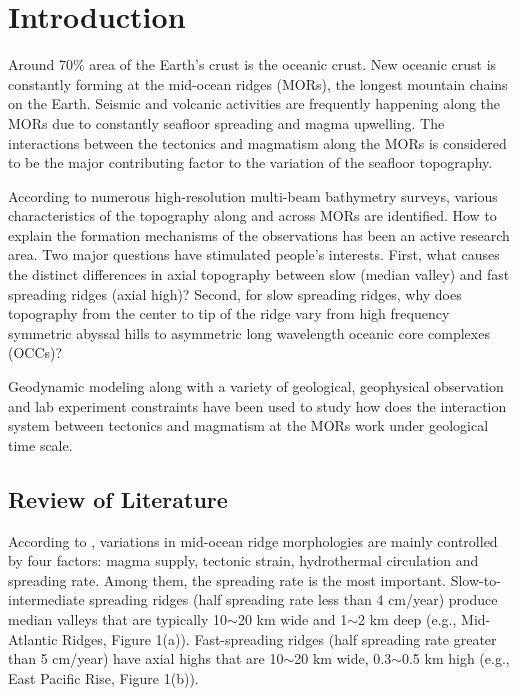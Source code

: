 \pagebreak
\section{Introduction}
\label{ch:Intro}  %

Around 70\% area of the Earth's crust is the oceanic crust. New oceanic crust is constantly forming at the mid-ocean ridges (MORs), the longest mountain chains on the Earth. Seismic and volcanic activities are frequently happening along the MORs due to constantly seafloor spreading and magma upwelling. The interactions between the tectonics and magmatism along the MORs is considered to be the major contributing factor to the variation of the seafloor topography.    

According to numerous high-resolution multi-beam bathymetry surveys, various characteristics of the topography along and across MORs are identified. How to explain the formation mechanisms of the observations has been an active research area. Two major questions have stimulated people's interests. First, what causes the distinct differences in axial topography between slow (median valley) and fast spreading ridges (axial high)? Second, for slow spreading ridges, why does topography from the center to tip of the ridge vary from high frequency symmetric abyssal hills to asymmetric long wavelength oceanic core complexes (OCCs)?

Geodynamic modeling along with a variety of geological, geophysical observation and lab experiment constraints have been used to study how does the interaction system between tectonics and magmatism at the MORs work under geological time scale.

\subsection{Review of Literature}
According to \citep{Fowler2004}, variations in  mid-ocean ridge morphologies are mainly controlled by four factors: magma supply, tectonic strain, hydrothermal circulation and spreading rate. Among them, the spreading rate is the most important. Slow-to-intermediate spreading ridges (half spreading rate less than 4 cm/year) produce median valleys that are typically 10$\sim$20 km wide and 1$\sim$2 km deep (e.g., Mid-Atlantic Ridges, Figure 1(a)). Fast-spreading ridges (half spreading rate greater than 5 cm/year) have axial highs  that are 10$\sim$20 km wide, 0.3$\sim$0.5 km high (e.g., East Pacific Rise, Figure 1(b)).

